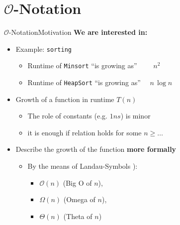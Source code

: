 \section{\texorpdfstring{$\mathcal{O}$}{O}-Notation}


\begin{frame}{$\mathcal{O}$-Notation}{Motivation}
  \textbf{We are interested in:}
  \begin{itemize}
  \item
    Example: \texttt{sorting}
    \begin{itemize}
      \item
        Runtime of \texttt{Minsort} \enquote{is growing as}
        $\quad{}\quad{}n^2$
      \item
         Runtime of \texttt{HeapSort} \enquote{is growing as}
         $\quad{}n \, \log n$
    \end{itemize}
    \item<2- |handout:1>
      Growth of a function in runtime $T(n)$
      \begin{itemize}
      \item The role of constants (e.g. $1ns$) is minor
      \item it is enough if relation holds for some $n\geq \ldots$
      \end{itemize}
    \item<3- |handout:1>
      Describe the growth of the function \textbf{more formally}
    \begin{itemize}
      \item
        By the means of Landau-Symbols \cite{wikipedia_big_o_notation}):
            \begin{itemize}
                \item
                    {\color{Mittel-Blau}$\mathcal{O}(n)$} (Big O of $n$),
                \item
                    {\color{Mittel-Blau}$\Omega (n)$} (Omega of $n$),
                \item
                    {\color{Mittel-Blau}$\Theta (n)$} (Theta of $n$)
            \end{itemize}
    \end{itemize}
  \end{itemize}
\end{frame}


